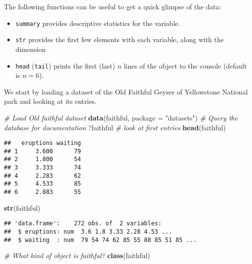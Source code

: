 \documentclass[]{book}
\newenvironment{Shaded}{\begin{snugshade}}{\end{snugshade}}
\newcommand{\KeywordTok}[1]{\textcolor[rgb]{0.13,0.29,0.53}{\textbf{#1}}}
\newcommand{\DataTypeTok}[1]{\textcolor[rgb]{0.13,0.29,0.53}{#1}}
\newcommand{\StringTok}[1]{\textcolor[rgb]{0.31,0.60,0.02}{#1}}
\newcommand{\CommentTok}[1]{\textcolor[rgb]{0.56,0.35,0.01}{\textit{#1}}}
\newcommand{\NormalTok}[1]{#1}
\providecommand{\tightlist}{%
  \setlength{\itemsep}{0pt}\setlength{\parskip}{0pt}}
\theoremstyle{definition}
\theoremstyle{definition}
\theoremstyle{definition}
\theoremstyle{remark}
\begin{document}
The following functions can be useful to get a quick glimpse of the
data:

\begin{itemize}
\tightlist
\item
  \texttt{summary} provides descriptive statistics for the variable.
\item
  \texttt{str} provides the first few elements with each variable, along
  with the dimension
\item
  \texttt{head} (\texttt{tail}) prints the first (last) \(n\) lines of
  the object to the console (default is \(n=6\)).
\end{itemize}

We start by loading a dataset of the Old Faithful Geyser of Yellowstone
National park and looking at its entries.

\begin{Shaded}
\begin{Highlighting}[]
\CommentTok{# Load Old faithful dataset}
\KeywordTok{data}\NormalTok{(faithful, }\DataTypeTok{package =} \StringTok{"datasets"}\NormalTok{)}
\CommentTok{# Query the database for documentation}
\NormalTok{?faithful}
\CommentTok{# look at first entries}
\KeywordTok{head}\NormalTok{(faithful)}
\end{Highlighting}
\end{Shaded}

\begin{verbatim}
##   eruptions waiting
## 1     3.600      79
## 2     1.800      54
## 3     3.333      74
## 4     2.283      62
## 5     4.533      85
## 6     2.883      55
\end{verbatim}

\begin{Shaded}
\begin{Highlighting}[]
\KeywordTok{str}\NormalTok{(faithful)}
\end{Highlighting}
\end{Shaded}

\begin{verbatim}
## 'data.frame':    272 obs. of  2 variables:
##  $ eruptions: num  3.6 1.8 3.33 2.28 4.53 ...
##  $ waiting  : num  79 54 74 62 85 55 88 85 51 85 ...
\end{verbatim}

\begin{Shaded}
\begin{Highlighting}[]
\CommentTok{# What kind of object is faithful? }
\KeywordTok{class}\NormalTok{(faithful)}
\end{Highlighting}
\end{Shaded}
\end{document}
